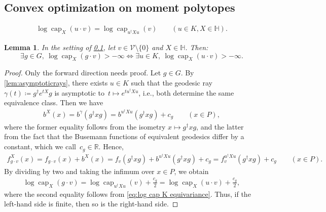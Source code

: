 \documentclass[10pt,a4paper]{amsart}
\newtheorem{lemma}{Lemma}
\newcommand{\RR}{\mathbb{R}}
\newcommand{\VV}{\mathcal{V}}
\newcommand{\bbH}{\mathbb{H}}
\DeclareMathOperator{\capacity}{cap}
\begin{document}
\subsection{Convex optimization on moment polytopes}\label{sub:convex_optimization_on_moment_polytopes}

\begin{align}\label{eq:log cap K equivariance}
    \log\capacity_X(u \cdot v)
= \log\capacity_{u^\dagger X u}(v)
\qquad (u \in K, X \in \bbH).
\end{align}

\begin{lemma}\label{lem:shiftingtrick}
In the setting of \cref{sub:convex_optimization_on_moment_polytopes}, let $v \in \VV\setminus\{0\}$ and $X \in \bbH$.
Then:
    \[
        \exists g \in G,\ \log\capacity_X(g\cdot v) > -\infty \iff \exists u \in K,\ \log\capacity_X(u \cdot v) > -\infty.
    \]
\end{lemma}

\begin{proof}
Only the forward direction needs proof.
Let $g \in G$.
By \cref{lem:asymptoticrays}, there exists $u \in K$ such that the geodesic ray $\gamma(t) \coloneqq g^\dagger e^{tX}g$ is asymptotic to~$t \mapsto e^{t u^\dagger Xu}$, i.e., both determine the same equivalence class.
Then we have
\begin{align*}
    b^X(x)
= b^\gamma(g^\dagger x g)
= b^{u^\dagger X u}(g^\dagger x g) + c_g \qquad (x \in P),
\end{align*}
where the former equality follows from the isometry $x \mapsto g^\dagger xg$, and the latter from the fact that the Busemann functions of equivalent geodesics differ by a constant, which we call~$c_g \in \RR$.
Hence,
\begin{align*}
    f_{g\cdot v}^X(x)
= f_{g\cdot v}(x) + b^X(x)
= f_v(g^\dagger x g) + b^{u^\dagger X u}(g^\dagger x g) + c_g
= f_v^{u^\dagger X u}(g^\dagger x g) + c_g
\qquad (x \in P).
\end{align*}
By dividing by two and taking the infimum over $x \in P$, we obtain
\begin{align*}
    \log\capacity_X(g \cdot v)
= \log\capacity_{u^\dagger X u}(v) + \tfrac{c_g}2
= \log\capacity_X(u \cdot v) + \tfrac{c_g}2,
\end{align*}
where the second equality follows from \cref{eq:log cap K equivariance}.
Thus, if the left-hand side is finite, then so is the right-hand side.
\end{proof}
\end{document}

